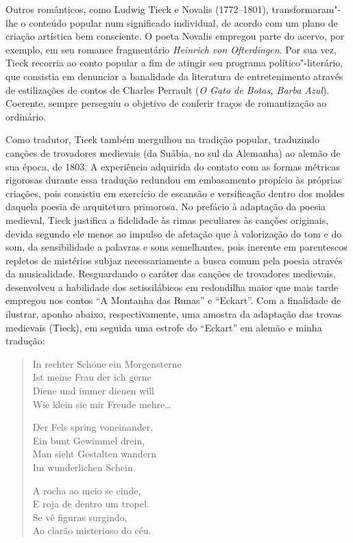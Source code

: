Outros românticos, como Ludwig Tieck e Novalis (1772--1801),
transformaram"-lhe o conteúdo popular num significado individual, de
acordo com um plano de criação artística bem consciente. O poeta
Novalis empregou parte do acervo, por exemplo, em seu romance
fragmentário \textit{Heinrich von Ofterdingen}. Por sua vez, Tieck
recorria ao conto popular a fim de atingir seu programa
político"-literário, que consistia em denunciar a banalidade da
literatura de entretenimento através de estilizações de contos de
Charles Perrault (\textit{O Gato de Botas, Barba Azul}). Coerente, sempre
perseguiu o objetivo de conferir traços de romantização ao \mbox{ordinário}.  

Como tradutor, Tieck também mergulhou na tradição popular, traduzindo
canções de trovadores medievais (da
Suábia, no sul da Alemanha) ao alemão de sua época, de 1803. A experiência
adquirida do contato com as formas métricas rigorosas durante essa
tradução redundou em embasamento propício às próprias criações, pois
consistiu em exercício de escansão e versificação dentro dos moldes
daquela poesia de arquitetura primorosa. No prefácio à adaptação da
poesia medieval, Tieck justifica a fidelidade às rimas peculiares às
canções originais, devida segundo ele menos ao impulso de afetação que
à valorização do tom e do som, da sensibilidade a palavras e sons
semelhantes, pois inerente em parentescos repletos de mistérios subjaz
necessariamente a busca comum pela poesia através da musicalidade.
Resguardando o caráter das canções de trovadores medievais, desenvolveu
a habilidade dos setissilábicos em redondilha maior que mais tarde
empregou nos contos ``A Montanha das Runas'' e ``Eckart''. Com a
finalidade de ilustrar, aponho abaixo, respectivamente, uma amostra da
adaptação das trovas medievais (Tieck), em seguida uma estrofe do
``Eckart'' em alemão e minha tradução:

\begin{verse}
In rechter Schöne ein Morgensterne\\
Ist meine Frau der ich gerne\\
Diene und immer dienen will\\
Wie klein sie mir Freude mehre\ldots{}

Der Fels spring voneinander,\\
Ein bunt Gewimmel drein,\\
Man sieht Gestalten wandern\\
Im wunderlichen Schein.

A rocha ao meio se cinde,\\
E roja de dentro um tropel.\\
Se vê figuras surgindo,\\
Ao clarão misterioso do céu.
\end{verse}

